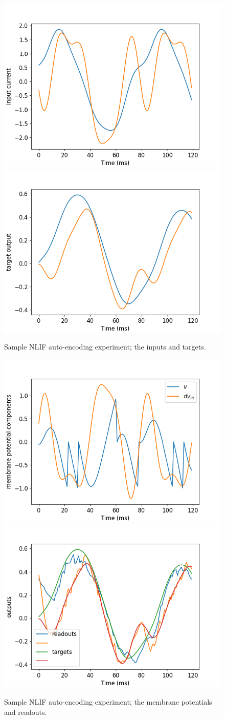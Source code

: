 \documentclass[mphil,deptreport,ianc]{infthesis} %
\begin{document}
\begin{figure}[!h]
    \centering
    \includegraphics[width=0.49\columnwidth]{figures/Supplementary/gating/NLIF/AutoEncoding/01-04_16-42-46-568/test_plot_inputs_NLIF_24.png}
    \includegraphics[width=0.49\columnwidth]{figures/Supplementary/gating/NLIF/AutoEncoding/01-04_16-42-46-568/test_plot_itargets_NLIF_24.png}
    \caption{Sample NLIF auto-encoding experiment; the inputs and targets.}
    \label{fig:NLIF_AE_1_inputs_targets}
\end{figure}

\begin{figure}[!h]
    \centering
    \includegraphics[width=0.49\columnwidth]{figures/Supplementary/gating/NLIF/AutoEncoding/01-04_16-42-46-568/test_plot_mem_voltage_single_neuron_NLIF_seed__24.png}
    \includegraphics[width=0.49\columnwidth]{figures/Supplementary/gating/NLIF/AutoEncoding/01-04_16-42-46-568/test_plot_outputs_NLIF_seed_24.png}
    \caption{Sample NLIF auto-encoding experiment; the membrane potentials and readouts.}
    \label{fig:NLIF_AE_1_vs_outs}
\end{figure}
\end{document}
